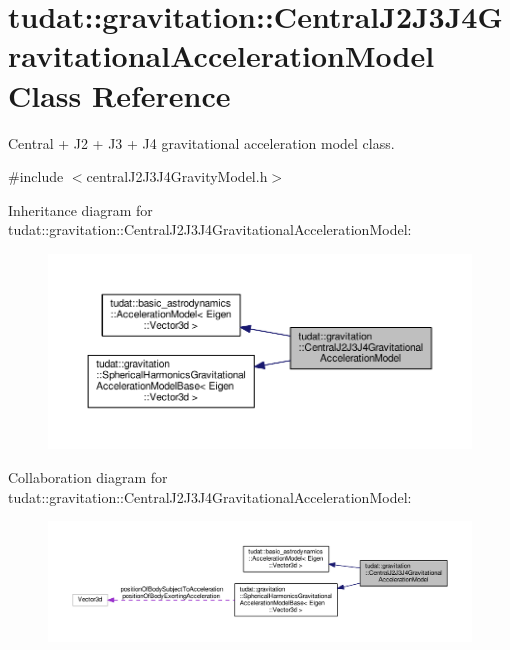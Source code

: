 \hypertarget{classtudat_1_1gravitation_1_1CentralJ2J3J4GravitationalAccelerationModel}{}\section{tudat\+:\+:gravitation\+:\+:Central\+J2\+J3\+J4\+Gravitational\+Acceleration\+Model Class Reference}
\label{classtudat_1_1gravitation_1_1CentralJ2J3J4GravitationalAccelerationModel}


Central + J2 + J3 + J4 gravitational acceleration model class.  




{\ttfamily \#include $<$central\+J2\+J3\+J4\+Gravity\+Model.\+h$>$}



Inheritance diagram for tudat\+:\+:gravitation\+:\+:Central\+J2\+J3\+J4\+Gravitational\+Acceleration\+Model\+:
\nopagebreak
\begin{figure}[H]
\begin{center}
\leavevmode
\includegraphics[width=350pt]{classtudat_1_1gravitation_1_1CentralJ2J3J4GravitationalAccelerationModel__inherit__graph}
\end{center}
\end{figure}


Collaboration diagram for tudat\+:\+:gravitation\+:\+:Central\+J2\+J3\+J4\+Gravitational\+Acceleration\+Model\+:
\nopagebreak
\begin{figure}[H]
\begin{center}
\leavevmode
\includegraphics[width=350pt]{classtudat_1_1gravitation_1_1CentralJ2J3J4GravitationalAccelerationModel__coll__graph}
\end{center}
\end{figure}

